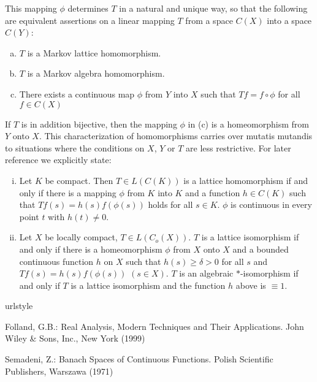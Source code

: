 This mapping $\phi$ determines $T$ in a natural and unique way, so that the following are equivalent assertions on a linear mapping $T$ from a space $C(X)$ into a space $C(Y)$:
\begin{enumerate}[(a)]
\item 
$T$ is a Markov lattice homomorphism.
\item 
$T$ is a Markov algebra homomorphism.
\item 
There exists a continuous map $\phi$ from $Y$ into $X$ such that $Tf = f \circ \phi$ for all $f \in C(X)$
\end{enumerate}
If $T$ is in addition bijective, then the mapping $\phi$ in (c) is a homeomorphism from $Y$ onto $X$.
This characterization of homomorphisms carries over mutatis mutandis to situations where the conditions on $X$, $Y$ or $T$ are less restrictive.
For later reference we explicitly state:
\begin{enumerate}[(i)]
\item Let $K$ be compact. Then $T \in L(C(K))$ is a lattice homomorphism if and only if there is a mapping $\phi$ from $K$ into $K$ and a function
$h \in C(K)$ such that $Tf(s) = h(s)f(\phi(s))$ holds for all $s \in K$.
$\phi$ is continuous in every point $t$ with $h(t) \neq 0$.


\item Let $X$ be locally compact, $T \in L(C_{o}(X))$.
$T$ is a lattice isomorphism if and only if there is a homeomorphism $\phi$ from $X$ onto $X$ and a bounded continuous function $h$ on $X$ such that $h(s) \geq \delta > 0$ for all $s$ and $Tf(s) = h(s)f(\phi(s))$ $(s \in X)$.
$T$ is an algebraic $*$-isomorphism if and only if $T$ is a lattice isomorphism and the function $h$ above is $\equiv 1$.

\end{enumerate}


\begin{thebibliography}{1}
\providecommand{\url}[1]{{#1}}
\providecommand{\urlprefix}{URL }
\expandafter\ifx\csname urlstyle\endcsname\relax
  \providecommand{\doi}[1]{DOI~\discretionary{}{}{}#1}\else
  \providecommand{\doi}{DOI~\discretionary{}{}{}\begingroup
  \urlstyle{rm}\Url}\fi

Folland, G.B.: Real Analysis, Modern Techniques and Their Applications.
\newblock John Wiley \& Sons, Inc., New York (1999)

Semadeni, Z.: Banach Spaces of Continuous Functions.
\newblock Polish Scientific Publishers, Warszawa (1971)

\end{thebibliography}






